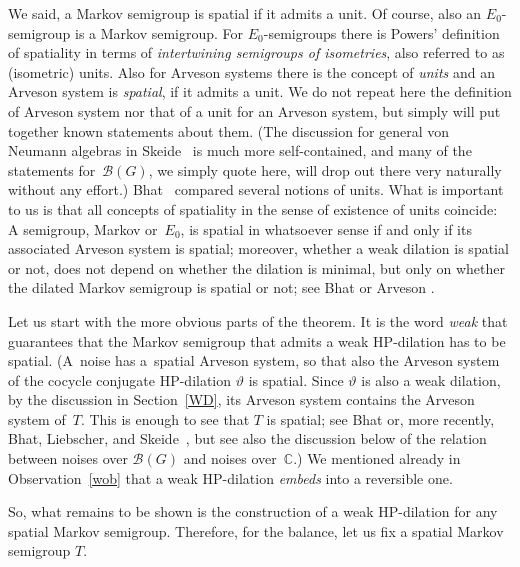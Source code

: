 \documentclass[11pt]{article}
\numberwithin{equation}{section}
\newcommand{\eus}[1]{\mathscr{#1}}
\newcommand{\bb}[1]{\mathbb{#1}}
\newcommand{\vt}{\vartheta}
\newcommand{\C}{\bb{C}}
\newcommand{\sB}{\eus{B}}
\numberwithin{equation}{section}
\begin{document}
We said, a Markov semigroup is spatial if it admits a unit. Of course, also an $E_0$-semigroup is a Markov semigroup. For $E_0$-semigroups there is Powers' definition \cite{Pow87} of spatiality in terms of {\it intertwining semigroups of isometries}, also referred to as (isometric) units. Also for Arveson systems there is the concept of {\it units} and an Arveson system is \emph{spatial}, if it admits a unit. We do not repeat here the definition of Arveson system nor that of a unit for an Arveson system, but simply will put together known statements about them. (The discussion for general von Neumann algebras in Skeide~\cite{Ske16} is much more self-contained, and many of the statements for~$\sB(G)$, we simply quote here, will drop out there very naturally without any effort.) Bhat~\cite[Section~6]{Bha01} compared several notions of units. What is important to us is that all concepts of spatiality in the sense of existence of units coincide: A semigroup, Markov or~$E_0$, is spatial in whatsoever sense if and only if its associated Arveson system is spatial; moreover, whether a weak dilation is spatial or not, does not depend on whether the dilation is minimal, but only on whether the dilated Markov semigroup is spatial or not; see Bhat \cite[Section~6]{Bha01} or Arveson \cite[Sections~8.9 and~8.10]{Arv03}.

Let us start with the more obvious parts of the theorem. It is the word {\it weak} that guarantees that the Markov semigroup that admits a weak HP-dilation has to be spatial. (A~noise has a~spatial Arveson system, so that also the Arveson system of the cocycle conjugate HP-dilation $\vt$ is spatial. Since $\vt$ is also a weak dilation, by the discussion in Section~\ref{WD}, its Arveson system contains the Arveson system of~$T$. This is enough to see that $T$ is spatial; see Bhat \cite[Section~6]{Bha01} or, more recently, Bhat, Liebscher, and Skeide~\cite{BLS10}, but see also the discussion below of the relation between noises over $\sB(G)$ and noises over~$\C$.) We mentioned already in Observation~\ref{wob} that a weak HP-dilation {\it embeds} into a reversible one.

So, what remains to be shown is the construction of a weak HP-dilation for any spatial Markov semigroup. Therefore, for the balance, let us fix a spatial Markov semigroup $T$.
\end{document}
